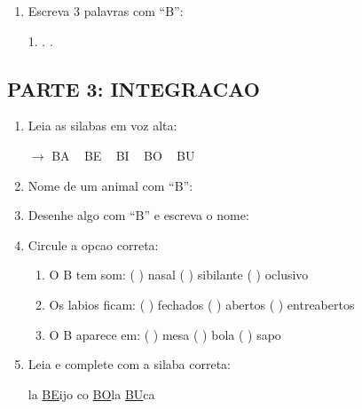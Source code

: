 \begin{exercicio}
\begin{enumerate}[resume]
  \item Escreva 3 palavras com ``B'':
  \begin{center}
  1. \underline{\hspace{4cm}} . \underline{\hspace{4cm}} . \underline{\hspace{4cm}}
  \end{center}
\end{enumerate}

\subsection*{PARTE 3: INTEGRACAO}

\begin{enumerate}[resume]
  \item Leia as silabas em voz alta:
  \begin{center}
  $\rightarrow$ BA  ~  BE  ~  BI  ~  BO  ~  BU
  \end{center}

  \item Nome de um animal com ``B'':
  \begin{center}
  \underline{\hspace{6cm}}
  \end{center}

  \item Desenhe algo com ``B'' e escreva o nome:
  \begin{center}
  \end{center}

  \item Circule a opcao correta:
  \begin{enumerate}[label=(\alph*)]
    \item O B tem som: ( ) nasal ( ) sibilante ( ) oclusivo
    \item Os labios ficam: ( ) fechados ( ) abertos ( ) entreabertos
    \item O B aparece em: ( ) mesa ( ) bola ( ) sapo
  \end{enumerate}

  \item Leia e complete com a silaba correta:
  \begin{center}
  la \quad \underline{BE}ijo \quad {}co \quad \underline{BO}la \quad \underline{BU}ca
  \end{center}
\end{enumerate}
\end{exercicio}

